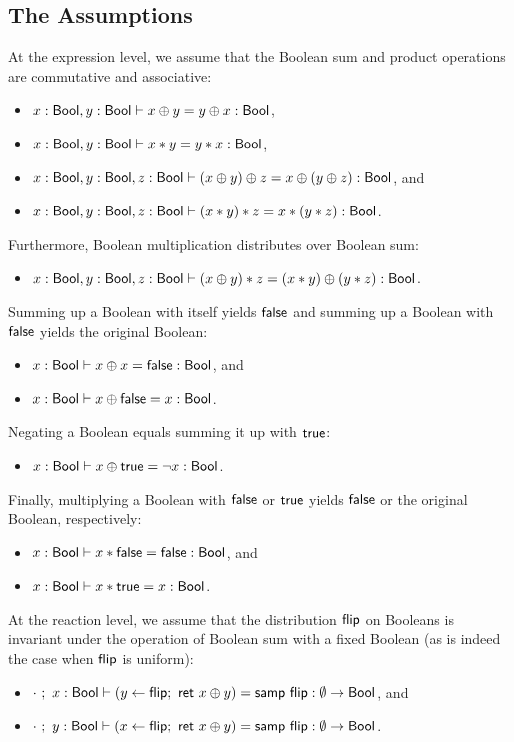\subsection{The Assumptions}
At the expression level, we assume that the Boolean sum and product operations are commutative and associative:
\begin{itemize}
\item $x : \mathsf{Bool}, y : \mathsf{Bool} \vdash x \oplus y = y \oplus x : \mathsf{Bool}$,
\item $x : \mathsf{Bool}, y : \mathsf{Bool} \vdash x * y = y * x : \mathsf{Bool}$,
\item $x : \mathsf{Bool}, y : \mathsf{Bool}, z : \mathsf{Bool} \vdash (x \oplus y) \oplus z = x \oplus (y \oplus z) : \mathsf{Bool}$, and
\item $x : \mathsf{Bool}, y : \mathsf{Bool}, z : \mathsf{Bool} \vdash (x * y) * z = x * (y * z) : \mathsf{Bool}$.
\end{itemize}
Furthermore, Boolean multiplication distributes over Boolean sum:
\begin{itemize}
\item $x : \mathsf{Bool}, y : \mathsf{Bool}, z : \mathsf{Bool} \vdash (x \oplus y) * z = (x * y) \oplus (y * z) : \mathsf{Bool}$.
\end{itemize}
Summing up a Boolean with itself yields $\mathsf{false}$ and summing up a Boolean with $\mathsf{false}$ yields the original Boolean:
\begin{itemize}
\item $x : \mathsf{Bool} \vdash x \oplus x = \mathsf{false} : \mathsf{Bool}$, and
\item $x : \mathsf{Bool} \vdash x \oplus \mathsf{false} = x : \mathsf{Bool}$.
\end{itemize}
Negating a Boolean equals summing it up with $\mathsf{true}$:
\begin{itemize}
\item $x : \mathsf{Bool} \vdash x \oplus \mathsf{true} = \neg x : \mathsf{Bool}$.
\end{itemize}
Finally, multiplying a Boolean with $\mathsf{false}$ or $\mathsf{true}$ yields $\mathsf{false}$ or the original Boolean, respectively:
\begin{itemize}
\item $x : \mathsf{Bool} \vdash x * \mathsf{false} = \mathsf{false} : \mathsf{Bool}$, and
\item $x : \mathsf{Bool} \vdash x * \mathsf{true} = x : \mathsf{Bool}$.
\end{itemize}
At the reaction level, we assume that the distribution $\mathsf{flip}$ on Booleans is invariant under the operation of Boolean sum with a fixed Boolean (as is indeed the case when $\mathsf{flip}$ is uniform):
\begin{itemize}
\item $\cdot \ ; \ x : \mathsf{Bool} \vdash (y \leftarrow \mathsf{flip}; \ \mathsf{ret} \ x \oplus y) = \mathsf{samp} \ \mathsf{flip} : \emptyset \to \mathsf{Bool}$, and
\item $\cdot \ ; \ y : \mathsf{Bool} \vdash (x \leftarrow \mathsf{flip}; \ \mathsf{ret} \ x \oplus y) = \mathsf{samp} \ \mathsf{flip} : \emptyset \to \mathsf{Bool}$.
\end{itemize}

